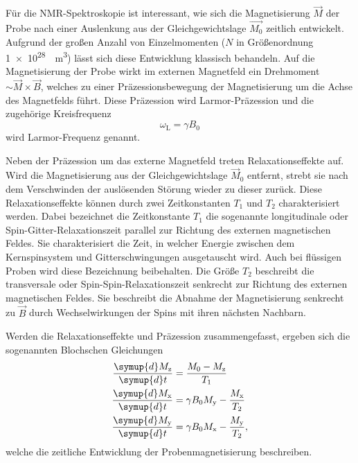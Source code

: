 Für die NMR-Spektroskopie ist interessant, wie sich die Magnetisierung $\vec{M}$
der Probe nach einer Auslenkung aus der Gleichgewichtslage $\vec{M_0}$
zeitlich entwickelt.
Aufgrund der großen Anzahl von Einzelmomenten
($N$ in Größenordnung \SI[retain-unity-mantissa=false]{1e28}{\per\cubic\meter})
lässt sich diese Entwicklung klassisch behandeln.
Auf die Magnetisierung der Probe wirkt im externen Magnetfeld ein Drehmoment
$\sim \vec{M} \times \vec{B}$,
welches zu einer Präzessionsbewegung der Magnetisierung um die Achse des
Magnetfelds führt.
Diese Präzession wird Larmor-Präzession und die zugehörige Kreisfrequenz
\begin{equation}
  \omega_\text{L} = \gamma B_0
\end{equation}
wird Larmor-Frequenz genannt.

Neben der Präzession um das externe Magnetfeld treten Relaxationseffekte auf.
Wird die Magnetisierung aus der Gleichgewichtslage $\vec{M}_0$ entfernt,
strebt sie nach dem Verschwinden der auslösenden Störung wieder zu dieser zurück.
Diese Relaxationseffekte können durch zwei Zeitkonstanten $T_1$ und
$T_2$ charakterisiert werden.
Dabei bezeichnet die Zeitkonstante $T_1$ die sogenannte longitudinale oder
Spin-Gitter-Relaxationszeit parallel zur Richtung des externen magnetischen Feldes.
Sie charakterisiert die Zeit, in welcher Energie zwischen dem Kernspinsystem
und Gitterschwingungen ausgetauscht wird. Auch bei flüssigen Proben wird
diese Bezeichnung beibehalten.
Die Größe $T_2$ beschreibt die transversale oder Spin-Spin-Relaxationszeit
senkrecht zur Richtung des externen magnetischen Feldes.
Sie beschreibt die Abnahme der Magnetisierung senkrecht zu $\vec{B}$
durch Wechselwirkungen der Spins mit ihren nächsten Nachbarn.

Werden die Relaxationseffekte und Präzession zusammengefasst, ergeben sich
die sogenannten Blochschen Gleichungen
\begin{equation}
  \begin{split}
    \frac{\symup{d} M_\text{z}}{\symup{d} t} &= \frac{M_0 - M_\text{z}}{T_1} \\
    \frac{\symup{d} M_\text{x}}{\symup{d} t} &= 
      \gamma B_0 M_\text{y} - \frac{M_\text{x}}{T_2} \\
    \frac{\symup{d} M_\text{y}}{\symup{d} t} &=
      \gamma B_0 M_\text{x} - \frac{M_\text{y}}{T_2},
  \end{split}
  \label{eqn:Bloch-Gleichungen}
\end{equation}
welche die zeitliche Entwicklung der Probenmagnetisierung beschreiben.


